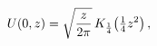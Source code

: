 \[\mathop{U\/}\nolimits\!\left(0,z\right)=\sqrt{\frac{z}{2\pi}}\mathop{K_{\frac{%
1}{4}}\/}\nolimits\!\left(\tfrac{1}{4}z^{2}\right),\]